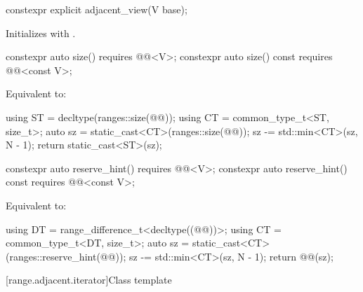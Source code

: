 %
\begin{itemdecl}
constexpr explicit adjacent_view(V base);
\end{itemdecl}

\begin{itemdescr}
\pnum
\effects
Initializes  with .
\end{itemdescr}

%
\begin{itemdecl}
constexpr auto size() requires @@<V>;
constexpr auto size() const requires @@<const V>;
\end{itemdecl}

\begin{itemdescr}
\pnum
\effects
Equivalent to:
\begin{codeblock}
using ST = decltype(ranges::size(@@));
using CT = common_type_t<ST, size_t>;
auto sz = static_cast<CT>(ranges::size(@@));
sz -= std::min<CT>(sz, N - 1);
return static_cast<ST>(sz);
\end{codeblock}
\end{itemdescr}

%
\begin{itemdecl}
constexpr auto reserve_hint() requires @@<V>;
constexpr auto reserve_hint() const requires @@<const V>;
\end{itemdecl}

\begin{itemdescr}
\pnum
\effects
Equivalent to:
\begin{codeblock}
using DT = range_difference_t<decltype((@@))>;
using CT = common_type_t<DT, size_t>;
auto sz = static_cast<CT>(ranges::reserve_hint(@@));
sz -= std::min<CT>(sz, N - 1);
return @@(sz);
\end{codeblock}
\end{itemdescr}

[range.adjacent.iterator]{Class template }

